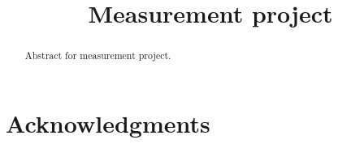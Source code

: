\documentclass{sig-alternate}
\begin{document}


\setlength{\paperheight}{11in}
\setlength{\paperwidth}{8.5in}
\setlength{\pdfpageheight}{\paperheight}
\setlength{\pdfpagewidth}{\paperwidth}

\title{Measurement project}

\author{
}

\maketitle

\begin{abstract}

Abstract for measurement project.

\end{abstract}




\vfill\eject


\section{Acknowledgments}

\vfill\eject
\end{document}
